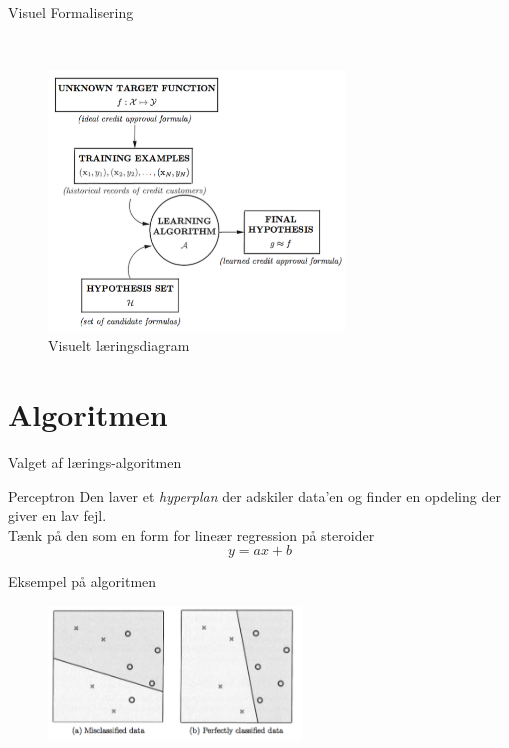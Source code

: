 \documentclass[12pt,t]{beamer}
\begin{document}
    \begin{frame}[c]{Visuel Formalisering}
        \begin{block}{~}
            \begin{figure}[h!]
                \caption{Visuelt læringsdiagram}
                \centering
                \includegraphics[width=0.7\textwidth]{dia.png}
            \end{figure}
        \end{block}
    \end{frame}


\section{Algoritmen}
\frame{\tableofcontents[currentsection]}

    \begin{frame}[t]{Valget af lærings-algoritmen}
        \begin{block}{Perceptron}
            Den laver et \emph{hyperplan} der adskiler data'en og finder en
            opdeling der giver en \alert{lav fejl}. \\
            \pause
            Tænk på den som en form for lineær regression på steroider
            $$
                y = ax + b
            $$
        \end{block}
        \pause
        \begin{block}{Eksempel på algoritmen}
            \begin{figure}[h!]
                \centering
                \includegraphics[width=0.6\textwidth]{per1.png}
            \end{figure}
        \end{block}
    \end{frame}
\end{document}
